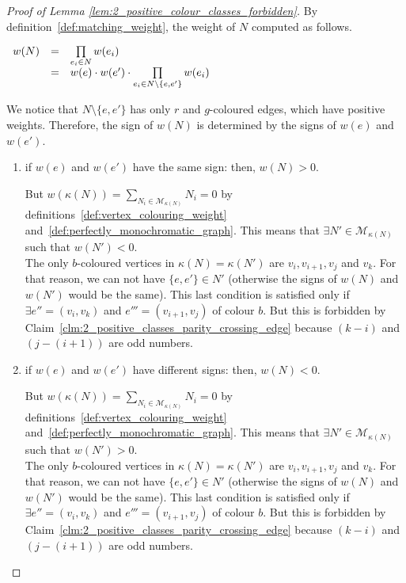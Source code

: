 \begin{proof}[Proof of Lemma \ref{lem:2_positive_colour_classes_forbidden}]
    By definition~\ref{def:matching_weight}, the weight of $N$ computed as follows.

    \begin{center}
        $\begin{array}{r c l}
            w(N) & = & \prod\limits_{e_i \in N} w(e_i) \\
                 & = & w(e) \cdot w(e') \cdot \prod\limits_{e_i \in N \setminus \{e, e'\}} w(e_i) \\
        \end{array}$
    \end{center}

    We notice that $N \setminus \{e, e'\}$ has only $r$ and $g$-coloured edges, which have positive weights.
    Therefore, the sign of $w(N)$ is determined by the signs of $w(e)$ and $w(e')$.

    \begin{enumerate}
        \item if $w(e)$ and $w(e')$ have the same sign: then, $w(N) > 0$.

            But $w(\kappa(N)) = \sum\limits_{N_i \in \mathcal{M}_{\kappa(N)}} N_i = 0$ by definitions~\ref{def:vertex_colouring_weight} and~\ref{def:perfectly_monochromatic_graph}.
            This means that $\exists N' \in \mathcal{M}_{\kappa(N)}$ such that $w(N') < 0$.\\

            The only $b$-coloured vertices in $\kappa(N) = \kappa(N')$ are $v_i, v_{i+1}, v_j$ and $v_k$.
            For that reason, we can not have $\{e, e'\} \in N'$ (otherwise the signs of $w(N)$ and $w(N')$ would be the same).
            This last condition is satisfied only if $\exists e'' = (v_i, v_k)$ and $e''' = (v_{i+1}, v_j)$ of colour $b$.
            But this is forbidden by Claim~\ref{clm:2_positive_classes_parity_crossing_edge} because $(k - i)$ and $\left(j - (i + 1)\right)$ are odd numbers.

        \item if $w(e)$ and $w(e')$ have different signs: then, $w(N) < 0$.

            But $w(\kappa(N)) = \sum\limits_{N_i \in \mathcal{M}_{\kappa(N)}} N_i = 0$ by definitions~\ref{def:vertex_colouring_weight} and~\ref{def:perfectly_monochromatic_graph}.
            This means that $\exists N' \in \mathcal{M}_{\kappa(N)}$ such that $w(N') > 0$.\\

            The only $b$-coloured vertices in $\kappa(N) = \kappa(N')$ are $v_i, v_{i+1}, v_j$ and $v_k$.
            For that reason, we can not have $\{e, e'\} \in N'$ (otherwise the signs of $w(N)$ and $w(N')$ would be the same).
            This last condition is satisfied only if $\exists e'' = (v_i, v_k)$ and $e''' = (v_{i+1}, v_j)$ of colour $b$.
            But this is forbidden by Claim~\ref{clm:2_positive_classes_parity_crossing_edge} because $(k - i)$ and $\left(j - (i + 1)\right)$ are odd numbers.\\


\end{enumerate}
\end{proof}
